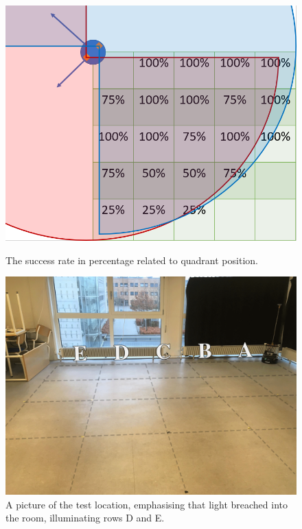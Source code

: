 \begin{figure}[H]
    \centering
    \begin{minipage}[b]{0.48\linewidth}
    \centering
    \includegraphics[width=\textwidth]{figures/LidarCoveragePercentage2.png}
    \caption{The success rate in percentage related to quadrant position.}
    \label{fig:LidarCoveragePercentage}
    \end{minipage}
    \hspace{0.2cm}
    \begin{minipage}[b]{0.48\linewidth}
    \centering
    \includegraphics[width=\textwidth]{figures/FigureLightPollution_nr.png}
    \caption{A picture of the test location, emphasising that light breached into the room, illuminating rows D and E.}
    \label{fig:FigureLightPolltuion}
    \end{minipage}
\end{figure}

